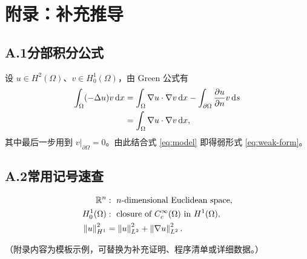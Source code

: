 \chapter*{附录：补充推导}

\section*{A.1\quad 分部积分公式}

设 $u\in H^2(\Omega)$、$v\in H_0^1(\Omega)$，由 Green 公式有
\begin{align}
\int_\Omega (-\Delta u) v \mathop{}\!\mathrm{d} x
&= \int_\Omega \nabla u\cdot\nabla v \mathop{}\!\mathrm{d} x
   - \int_{\partial\Omega} \frac{\partial u}{\partial n} v \mathop{}\!\mathrm{d} s \notag\\
&= \int_\Omega \nabla u\cdot\nabla v \mathop{}\!\mathrm{d} x,
\end{align}
其中最后一步用到 $v|_{\partial\Omega}=0$。由此结合式 \eqref{eq:model} 即得弱形式 \eqref{eq:weak-form}。

\section*{A.2\quad 常用记号速查}

\begin{align*}
\mathbb{R}^n &: \ n\text{-dimensional Euclidean space},\\
H_0^1(\Omega) &: \ \text{closure of } C_c^\infty(\Omega) \text{ in } H^1(\Omega),\\
\left\lVert u\right\rVert_{H^1}^2 &= \left\lVert u\right\rVert_{L^2}^2 + \left\lVert \nabla u\right\rVert_{L^2}^2.
\end{align*}

（附录内容为模板示例，可替换为补充证明、程序清单或详细数据。）
